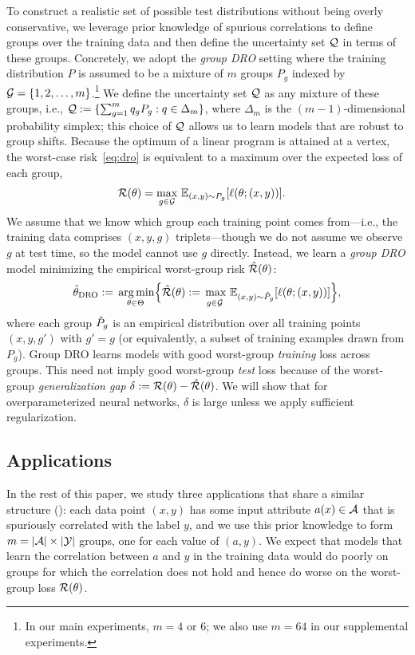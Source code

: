 To construct a realistic set of possible test distributions without being overly conservative,
we leverage prior knowledge of spurious correlations to define groups over the training data and then define the uncertainty set $\mathcal{Q}$ in terms of these groups.
Concretely, we adopt the \emph{group DRO} setting \citep{hu2018does,oren2019drolm} where the training distribution $P$ is assumed to be a mixture of $m$ groups $P_g$ indexed by $\mathcal{G} = \{1, 2, \ldots, m\}$.\footnote{
  In our main experiments, $m=4$ or $6$;
  we also use $m=64$ in our supplemental experiments.
}
We define the uncertainty set $\mathcal{Q}$ as any mixture of these groups,
i.e., $\mathcal{Q} := \{ \sum_{g=1}^m q_g P_g: q \in \Delta_m \}$,
where $\Delta_m$ is the $(m-1)$-dimensional probability simplex;
this choice of $\mathcal{Q}$ allows us to learn models that are robust to group shifts.
Because the optimum of a linear program is attained at a vertex,
the worst-case risk~\eqref{eq:dro} is equivalent to a maximum over the expected loss of each group,
\begin{align}
\label{eqn:groupdroq}
  \mathcal{R}(\theta)
  &= \underset{g \in \mathcal{G}}{\max} \ \mathbb{E}_{(x, y) \sim P_g}[\ell(\theta; (x, y))].
\end{align}
We assume that we know which group each training point comes from---i.e., the training data comprises $(x, y, g)$ triplets---though we do not assume we observe $g$ at test time, so the model cannot use $g$ directly.
Instead, we learn a \emph{group DRO} model minimizing the empirical worst-group risk $\hat{\mathcal{R}}(\theta)$:
\begin{align}\label{eqn:htdro}
  \htdro \eqdef \underset{\theta \in \Theta}{\vphantom{\sup}\argmin} \Bigl\{\hat\sR(\theta) :=  \underset{g \in \sG}{\vphantom{\argmin}\max} \ \E_{(x, y) \sim \hP_g}[\ell(\theta; (x, y))] \Bigr\},
\end{align}
where each group ${\hat{P}}_g$ is an empirical distribution over all training points $(x, y, g')$ with $g' = g$
(or equivalently, a subset of training examples drawn from $P_g$).
Group DRO learns models with good worst-group \emph{training} loss across groups.
This need not imply good worst-group \emph{test} loss
because of the worst-group \emph{generalization gap}
$\delta :=  \mathcal{R}(\theta)  -\hat{\mathcal{R}}(\theta)$.
We will show that for overparameterized neural networks,
$\delta$ is large unless we apply sufficient regularization.

\subsection{Applications}
In the rest of this paper,
we study three applications that share a similar structure ():
each data point $(x, y)$ has
some input attribute $a(x) \in \mathcal{A}$ that is spuriously correlated with the label $y$,
and we use this prior knowledge to form $m = |\mathcal{A}| \times |\mathcal{Y}|$ groups,
one for each value of $(a, y)$.
We expect that models that learn the correlation between $a$ and $y$ in the training data
would do poorly on groups for which the correlation does not hold
and hence do worse on the worst-group loss $\mathcal{R}(\theta)$.


